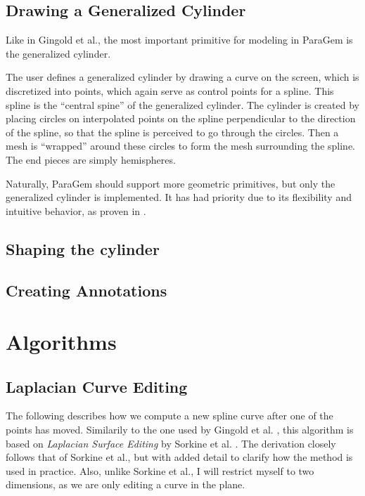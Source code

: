 \documentclass[english]{article}
\begin{document}
\subsection{Drawing a Generalized Cylinder}

Like in Gingold et al., the most important primitive for modeling in ParaGem is the generalized cylinder. 

The user defines a generalized cylinder by drawing a curve on the screen, which is discretized into points, which again serve as control points for a spline. 
This spline is the ``central spine'' of the generalized cylinder. The cylinder is created by placing circles on interpolated points on the spline perpendicular to the direction of the spline, so that the spline is perceived to go through the circles. Then a mesh is ``wrapped'' around these circles to form the mesh surrounding the spline. The end pieces are simply hemispheres.



Naturally, ParaGem should support more geometric primitives, but only the generalized cylinder is implemented. It has had priority due to its flexibility and intuitive behavior, as proven in \cite{gingold09}.

\subsection{Shaping the cylinder}

\subsection{Creating Annotations}


\pagebreak

\section{Algorithms} \label{section_algorithms}

\subsection{Laplacian Curve Editing}

The following describes how we compute a new spline curve after one of the points has moved. Similarily to the one used by Gingold et al. \cite{gingold09}, this algorithm is based on \textit{Laplacian Surface Editing} by Sorkine et al. \cite{sorkine04}. The derivation closely follows that of Sorkine et al., but with added detail to clarify how the method is used in practice. Also, unlike Sorkine et al., I will restrict myself to two dimensions, as we are only editing a curve in the plane.
\end{document}
